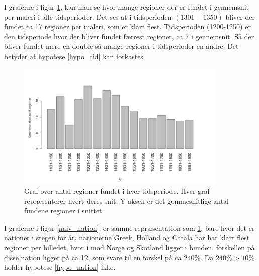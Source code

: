 I graferne i figur \ref{naiv_year}, kan man se hvor mange regioner der
er fundet i gennemsnit per maleri i alle tidsperioder. Det ses at i
tidsperioden $(1301-1350)$ bliver der fundet ca 17 regioner per maleri,
som er klart flest. Tidsperioden (1200-1250) er den tidsperiode hvor der
bliver fundet færrest regioner, ca 7 i gennemsnit. Så der bliver fundet
mere en double så mange regioner i tidsperioder en andre. Det betyder at
hypotese \ref{hypo_tid} kan forkastes.

\begin{figure}[!h]
	\begin{center}
		\includegraphics[angle=0,width=0.90\textwidth]{afsnit/resultater/billeder/yearcut.png}
	\end{center}
	\caption{Graf over antal regioner fundet i hver
       tidsperiode. Hver graf repræsenterer hvert deres snit. Y-aksen er
       det gemmesnitlige antal fundene regioner i snittet.}
	\label{naiv_year}
\end{figure}

I graferne i figur \ref{naiv_nation}, er samme repræsentation som
\ref{naiv_year}, bare hvor det er nationer i stegen for år. nationerne
Greek, Holland og Catala har har klart flest regioner per billedet, hvor
i mod Norge og Skotland ligger i bunden. forskellen på disse nation
ligger på ca 12, som svare til en forskel på ca $240\%$.
Da $240 \% > 10 \%$ holder hypotese \ref{hypo_nation} ikke.

